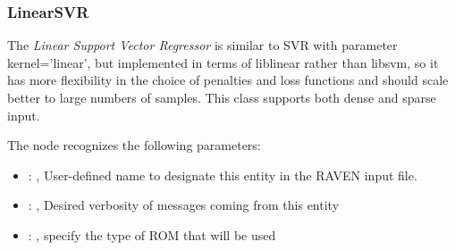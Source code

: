 \subsubsection{LinearSVR}
  The  \textit{Linear Support Vector Regressor} is
  similar to SVR with parameter kernel=’linear’, but implemented in terms of liblinear rather than
  libsvm,                             so it has more flexibility in the choice of penalties and loss
  functions and should scale better to large numbers of samples.                             This
  class supports both dense and sparse input.

  The  node recognizes the following parameters:
    \begin{itemize}
      \item {}: , 
        User-defined name to designate this entity in the RAVEN input file.
      \item {}: , 
        Desired verbosity of messages coming from this entity
      \item {}: , 
        specify the type of ROM that will be used
  \end{itemize}

